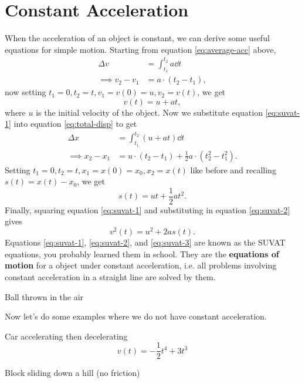 \documentclass[../classical_mechanics.tex]{subfiles}
\begin{document}
    \section{Constant Acceleration}\label{sec:constant-acceleration}
        When the acceleration of an object is constant, we can derive some useful equations for simple motion.
        Starting from equation \ref{eq:average-acc} above,
        \begin{align}
            \Delta v&=\int_{t_1}^{t_2}a\dd{t}\\
            \implies v_2-v_1&=a\cdot(t_2-t_1),
        \end{align}
        now setting $t_1=0,t_2=t,v_1=v(0)=u,v_2=v(t)$, we get
        \begin{equation}\label{eq:suvat-1}
            v(t)=u+at,
        \end{equation}
        where $u$ is the initial velocity of the object.
        Now we substitute equation \ref{eq:suvat-1} into equation \ref{eq:total-disp} to get
        \begin{align}
            \Delta x&=\int_{t_1}^{t_2}(u+at)\dd{t}\\
            \implies x_2-x_1&=u\cdot(t_2-t_1)+\frac{1}{2}a\cdot(t_2^2-t_1^2).
        \end{align}
        Setting $t_1=0,t_2=t,x_1=x(0)=x_0,x_2=x(t)$ like before and recalling $s(t)=x(t)-x_0$, we get
        \begin{equation}\label{eq:suvat-2}
            s(t)=ut+\frac{1}{2}at^2.
        \end{equation}
        Finally, squaring equation \ref{eq:suvat-1} and substituting in equation \ref{eq:suvat-2} gives
        \begin{equation}\label{eq:suvat-3}
            v^2(t)=u^2+2as(t).
        \end{equation}
        Equations \ref{eq:suvat-1}, \ref{eq:suvat-2}, and \ref{eq:suvat-3} are known as the SUVAT equations, you probably learned them in school.
        They are the \textbf{equations of motion} for a object under constant acceleration, i.e. all problems involving constant acceleration in a straight line are solved by them.
        \begin{example}
            Ball thrown in the air %
        \end{example}

        Now let's do some examples where we do not have constant acceleration.
        \begin{example}
            Car accelerating then decelerating %
            \begin{equation}
                v(t)=-\frac{1}{2}t^4+3t^3
            \end{equation}
        \end{example}
        \begin{example}
            Block sliding down a hill (no friction) %
        \end{example}
\end{document}
